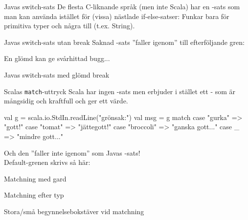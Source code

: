 \begin{Slide}{Javas switch-sats}\SlideFontSmall
De flesta C-liknande språk (men inte Scala) har en -sats som man kan använda istället för (vissa) nästlade if-else-satser: 
Funkar bara för primitiva typer och några till (t.ex. String).
\end{Slide}

\ifkompendium\else
\begin{Slide}{Javas switch-sats utan break}\SlideFontSmall
Saknad -sats ''faller igenom'' till efterföljande gren: 

En glömd  kan ge svårhittad bugg... 
\end{Slide}

\begin{Slide}{Javas switch-sats med glömd break}\SlideFontSmall

\vspace{-0.5em}

\vspace{-0.7em}\pause
{}

\end{Slide}


\begin{Slide}{Scalas \texttt{match}-uttryck}
Scala har ingen -sats men erbjuder i stället ett - som är mångsidig och kraftfull och ger ett värde.

\begin{Code}
val g = scala.io.StdIn.readLine("grönsak:")
val msg = g match {
  case "gurka" => "gott!"
  case "tomat" => "jättegott!"
  case "broccoli" => "ganska gott..."
  case _ => "mindre gott..."
}
\end{Code}
Och den ''faller inte igenom'' som Javas -sats! \\
Default-grenen skrivs så här: 
\end{Slide}

\begin{Slide}{Matchning med gard}
\end{Slide}

\begin{Slide}{Matchning efter typ}
\end{Slide}

\begin{Slide}{Stora/små begynnelsebokstäver vid matchning}
\end{Slide}


\fi





